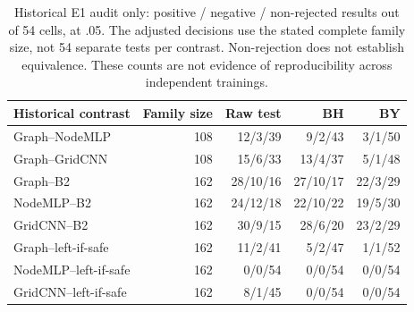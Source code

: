 \begin{table}[htbp]\centering\small
\caption{Historical E1 audit only: positive / negative / non-rejected results out of 54 cells, at .05. The adjusted decisions use the stated complete family size, not 54 separate tests per contrast. Non-rejection does not establish equivalence. These counts are not evidence of reproducibility across independent trainings.}
\label{tab:historical-audit}
\begin{tabular}{lrrrr}
\toprule
Historical contrast & Family size & Raw test & BH & BY\\
\midrule
Graph--NodeMLP &108&12/3/39&9/2/43&3/1/50\\
Graph--GridCNN &108&15/6/33&13/4/37&5/1/48\\
Graph--B2 &162&28/10/16&27/10/17&22/3/29\\
NodeMLP--B2 &162&24/12/18&22/10/22&19/5/30\\
GridCNN--B2 &162&30/9/15&28/6/20&23/2/29\\
Graph--left-if-safe &162&11/2/41&5/2/47&1/1/52\\
NodeMLP--left-if-safe &162&0/0/54&0/0/54&0/0/54\\
GridCNN--left-if-safe &162&8/1/45&0/0/54&0/0/54\\
\bottomrule
\end{tabular}
\end{table}
